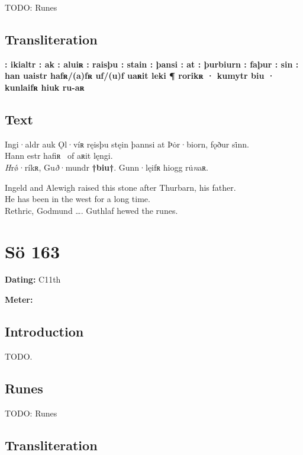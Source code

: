 TODO: Runes%

\subsection{Transliteration}

\textbf{: ikialtr : ak : aluiʀ : raisþu : stain : þansi : at : þurbiurn : faþur : sin : han uaistr hafʀ/(a)fʀ uf/(u)f uaʀit leki ¶ rorikʀ · kumytr biu · kunlaifʀ hiuk ru-aʀ}

\subsection{Text}

\bpg\bpa[0]%
\startsub Ingi·aldr auk Ǫl·víʀ ręisþu stęin þannsi at Þȯr·biorn, fǫður si̇nn.\endsub \\
Hann estr hafiʀ \hld\ of aʀit lęngi. \\
\emph{H}rǿ·ríkʀ, Gu\emph{ð}·mundr \textbf{†biu†}. Gunn·lęifʀ hiogg ru̇\emph{n}aʀ.\epa

\bpb Ingeld and Alewigh raised this stone after Thurbarn, his father. \\
He has been in the west for a long time. \\
Rethric, Godmund \dots. Guthlaf hewed the runes.\epb\epg

\sectionline\clearpage


\section{Sö 163}

\begin{flushright}%
\textbf{Dating:} C11th

\textbf{Meter:} \Fornyrdislag
\end{flushright}%

\subsection{Introduction}

TODO.

\subsection{Runes}

TODO: Runes%

\subsection{Transliteration}

